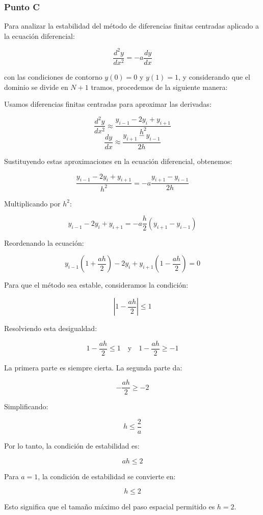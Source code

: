 \subsubsection{Punto C}

Para analizar la estabilidad del método de diferencias finitas centradas aplicado a la ecuación diferencial:

\[
\frac{d^2y}{dx^2} = -a\frac{dy}{dx}
\]

con las condiciones de contorno \( y(0) = 0 \) y \( y(1) = 1 \), y considerando que el dominio se divide en \( N + 1 \) tramos, procedemos de la siguiente manera:

Usamos diferencias finitas centradas para aproximar las derivadas:

\[
\frac{d^2y}{dx^2} \approx \frac{y_{i-1} - 2y_i + y_{i+1}}{h^2}
\]
\[
\frac{dy}{dx} \approx \frac{y_{i+1} - y_{i-1}}{2h}
\]

Sustituyendo estas aproximaciones en la ecuación diferencial, obtenemos:

\[
\frac{y_{i-1} - 2y_i + y_{i+1}}{h^2} = -a\frac{y_{i+1} - y_{i-1}}{2h}
\]

Multiplicando por \( h^2 \):

\[
y_{i-1} - 2y_i + y_{i+1} = -a \frac{h}{2} (y_{i+1} - y_{i-1})
\]

Reordenando la ecuación:

\[
y_{i-1} \left(1 + \frac{ah}{2}\right) - 2y_i + y_{i+1} \left(1 - \frac{ah}{2}\right) = 0
\]

Para que el método sea estable, consideramos la condición:

\[
|1 - \frac{a h}{2}| \leq 1
\]

Resolviendo esta desigualdad:

\[
1 - \frac{ah}{2} \leq 1 \quad \text{y} \quad 1 - \frac{a h}{2} \geq -1
\]

La primera parte es siempre cierta. La segunda parte da:

\[
-\frac{a h}{2} \geq -2
\]

Simplificando:

\[
h \leq \frac{2}{a}
\]

Por lo tanto, la condición de estabilidad es:

\[
a h \leq 2
\]

Para \( a = 1 \), la condición de estabilidad se convierte en:

\[
h \leq 2
\]

Esto significa que el tamaño máximo del paso espacial permitido es \( h = 2 \).




